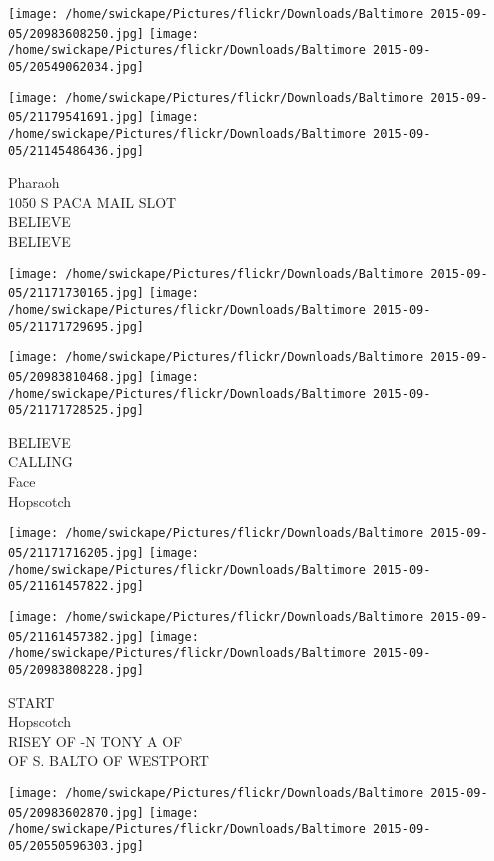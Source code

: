 \documentclass[10pt,letterpaper]{article}
\begin{document}
\texttt{[image: /home/swickape/Pictures/flickr/Downloads/Baltimore 2015-09-05/20983608250.jpg]}
\texttt{[image: /home/swickape/Pictures/flickr/Downloads/Baltimore 2015-09-05/20549062034.jpg]}

\texttt{[image: /home/swickape/Pictures/flickr/Downloads/Baltimore 2015-09-05/21179541691.jpg]}
\texttt{[image: /home/swickape/Pictures/flickr/Downloads/Baltimore 2015-09-05/21145486436.jpg]}

Pharaoh\\
1050 S PACA MAIL SLOT\\
BELIEVE\\
BELIEVE\\
\pagebreak

\texttt{[image: /home/swickape/Pictures/flickr/Downloads/Baltimore 2015-09-05/21171730165.jpg]}
\texttt{[image: /home/swickape/Pictures/flickr/Downloads/Baltimore 2015-09-05/21171729695.jpg]}

\texttt{[image: /home/swickape/Pictures/flickr/Downloads/Baltimore 2015-09-05/20983810468.jpg]}
\texttt{[image: /home/swickape/Pictures/flickr/Downloads/Baltimore 2015-09-05/21171728525.jpg]}

BELIEVE\\
CALLING\\
Face\\
Hopscotch\\
\pagebreak

\texttt{[image: /home/swickape/Pictures/flickr/Downloads/Baltimore 2015-09-05/21171716205.jpg]}
\texttt{[image: /home/swickape/Pictures/flickr/Downloads/Baltimore 2015-09-05/21161457822.jpg]}

\texttt{[image: /home/swickape/Pictures/flickr/Downloads/Baltimore 2015-09-05/21161457382.jpg]}
\texttt{[image: /home/swickape/Pictures/flickr/Downloads/Baltimore 2015-09-05/20983808228.jpg]}

START\\
Hopscotch\\
RISEY OF {-}N TONY A OF\\
OF S. BALTO OF WESTPORT\\
\pagebreak

\texttt{[image: /home/swickape/Pictures/flickr/Downloads/Baltimore 2015-09-05/20983602870.jpg]}
\texttt{[image: /home/swickape/Pictures/flickr/Downloads/Baltimore 2015-09-05/20550596303.jpg]}
\end{document}
